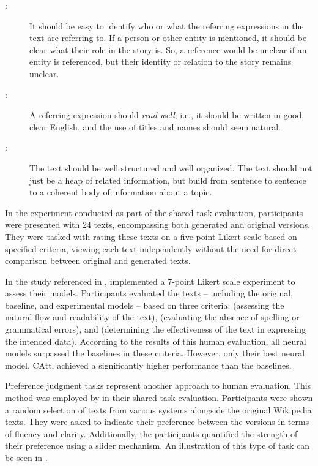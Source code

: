 \begin{description}
	\item [:] It should be easy to identify who or what the referring expressions in the text are referring to. If a person or other entity is mentioned, it should be clear what their role in the story is. So, a reference would be unclear if an entity is referenced, but their identity or relation to the story remains unclear.
	
	\item [:] A referring expression should \textit{read well}; i.e., it should be written in good, clear English, and the use of titles and names should seem natural.
	
	\item [:] The text should be well structured and well organized. The text should not just be a heap of related information, but build from sentence to sentence to a coherent body of information about a topic.
\end{description}


In the experiment conducted as part of the shared task evaluation, participants were presented with 24 texts, encompassing both generated and original versions. They were tasked with rating these texts on a five-point Likert scale based on specified criteria, viewing each text independently without the need for direct comparison between original and generated texts.

In the  study referenced in , \citet{ferreira2018neuralreg} implemented a 7-point Likert scale experiment to assess their models. Participants evaluated the texts -- including the original, baseline, and experimental models -- based on three criteria:  (assessing the natural flow and readability of the text),  (evaluating the absence of spelling or grammatical errors), and  (determining the effectiveness of the text in expressing the intended data). According to the results of this human evaluation, all neural models surpassed the baselines in these criteria. However, only their best neural model, CAtt, achieved a significantly higher performance than the baselines.

Preference judgment tasks represent another approach to human evaluation. This method was employed by \citet{belz2010generating} in their \grecnegnine shared task evaluation. Participants were shown a random selection of texts from various systems alongside the original Wikipedia texts. They were asked to indicate their preference between the versions in terms of fluency and clarity. Additionally, the participants quantified the strength of their preference using a slider mechanism. An illustration of this type of task can be seen in .

